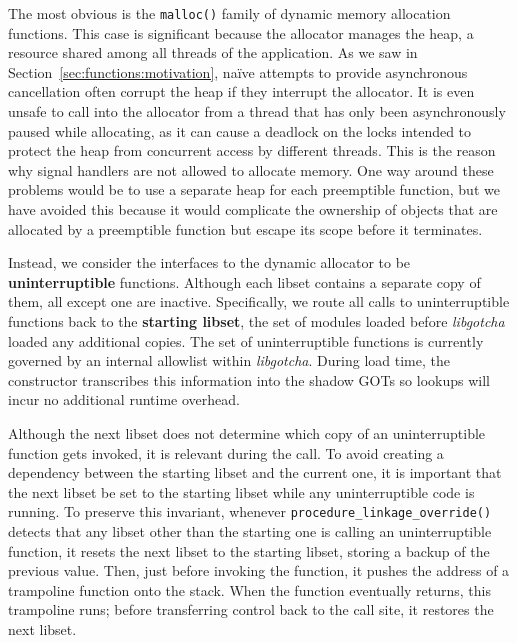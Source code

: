 The most obvious is the \texttt{malloc()} family of dynamic memory allocation
functions.  This case is significant because the allocator manages the heap, a
resource shared among all threads of the application.  As we saw in
Section~\ref{sec:functions:motivation}, na\"ive attempts to provide asynchronous
cancellation
often corrupt the heap if they interrupt the allocator.  It is even unsafe to
call into the allocator from a thread that has only been asynchronously paused while
allocating, as it can cause a deadlock on the locks intended to protect the heap from
concurrent access by different threads.  This is the reason why signal handlers are
not allowed to allocate memory.  One way around these problems would be to use a
separate heap for each preemptible function, but we have avoided this because it
would complicate the ownership of objects that are allocated by a preemptible
function but escape its scope before it terminates.

Instead, we consider the interfaces to the dynamic allocator to be
\textbf{uninterruptible} functions.  Although each libset contains a separate copy of
them, all except one are inactive.  Specifically, we route all calls to
uninterruptible functions back to the \textbf{starting libset}, the set of modules
loaded before \textit{libgotcha} loaded any additional copies.  The set of
uninterruptible functions is currently governed by an internal allowlist within
\textit{libgotcha}.  During load time, the constructor transcribes this information
into the shadow GOTs so lookups will incur no additional runtime overhead.

\begin{sloppypar}
Although the next libset does not determine which copy of an uninterruptible function
gets invoked, it is relevant during the call.  To avoid creating a dependency between
the starting libset and the current one, it is important that the next libset be set
to the starting libset while any uninterruptible code is running.  To preserve
this invariant, whenever \texttt{procedure\_linkage\_override()} detects that any
libset other than the starting one is calling an uninterruptible function, it resets
the next
libset to the starting libset, storing a backup of the previous value.  Then, just
before invoking the function, it pushes the address of a trampoline function onto the
stack.  When the function eventually returns, this trampoline runs; before
transferring control back to the call site, it restores the next libset.
\end{sloppypar}

